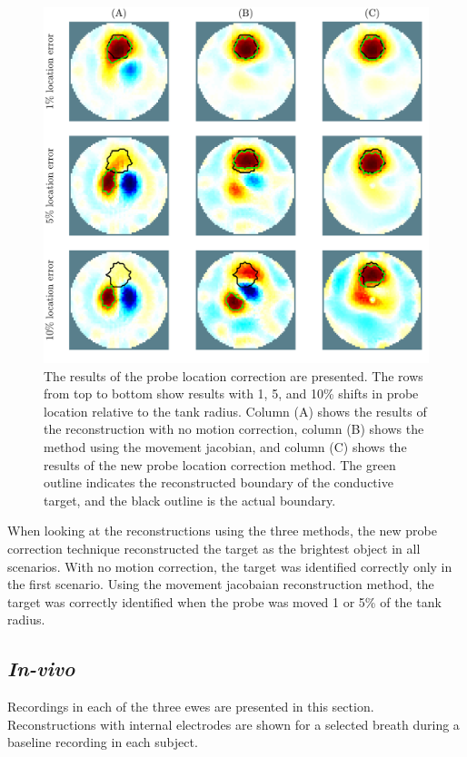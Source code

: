 \begin{figure}[H]
    \centering
	\includegraphics[width=\textwidth]{chapter7-internal_elec_motion/imgs/recon_accuracy_hollow.pdf} 
	\caption[Results of the probe location correction]{\label{fig:probe_location_correction} 
	The results of the probe location correction are presented. 
	The rows from top to bottom show results with 1, 5, and 10\% shifts in probe location 
	relative to the tank radius.
	Column (A) shows the results of the reconstruction  with no motion correction,
	column (B) shows the method using the movement jacobian, and 
	column (C) shows the results of the new probe location correction method.
	The green outline indicates the reconstructed boundary of the conductive target, 
	and the black outline is the actual boundary.}
\end{figure}

When looking at the reconstructions using the three methods, the new probe correction technique
reconstructed the target as the brightest object in all scenarios. With no motion correction, the 
target was identified correctly only in the first scenario. Using the movement jacobaian 
reconstruction method, the target was correctly identified when the probe was moved 1 or 5\%
of the tank radius. 

\subsection{\emph{In-vivo}}
Recordings in each of the three ewes are presented in this section.
Reconstructions with internal electrodes are shown
 for a selected breath during a 
baseline recording in each subject.

